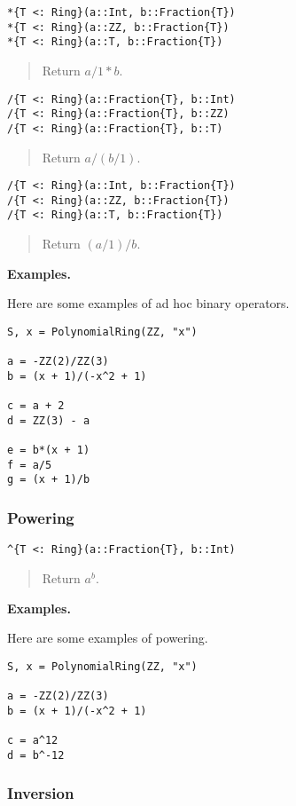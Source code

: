 \documentclass[a4paper,10pt]{article}
\newcommand{\desc}[1]{\vspace{-3mm}\begin{quote}#1\end{quote}}
\begin{document}
{{\begin{lstlisting}
*{T <: Ring}(a::Int, b::Fraction{T})
*{T <: Ring}(a::ZZ, b::Fraction{T})
*{T <: Ring}(a::T, b::Fraction{T})
\end{lstlisting}

\desc{Return $a/1 * b$.}

\begin{lstlisting}
/{T <: Ring}(a::Fraction{T}, b::Int)
/{T <: Ring}(a::Fraction{T}, b::ZZ)
/{T <: Ring}(a::Fraction{T}, b::T)
\end{lstlisting}

\desc{Return $a / (b/1)$.}

\begin{lstlisting}
/{T <: Ring}(a::Int, b::Fraction{T})
/{T <: Ring}(a::ZZ, b::Fraction{T})
/{T <: Ring}(a::T, b::Fraction{T})
\end{lstlisting}

\desc{Return $(a/1) / b$.}

\textbf{Examples.}

Here are some examples of ad hoc binary operators.

\begin{lstlisting}
S, x = PolynomialRing(ZZ, "x")

a = -ZZ(2)/ZZ(3)
b = (x + 1)/(-x^2 + 1)

c = a + 2
d = ZZ(3) - a

e = b*(x + 1)
f = a/5
g = (x + 1)/b
\end{lstlisting}

\subsubsection{Powering}

\begin{lstlisting}
^{T <: Ring}(a::Fraction{T}, b::Int)
\end{lstlisting}

\desc{Return $a^b$.}

\textbf{Examples.}

Here are some examples of powering.

\begin{lstlisting}
S, x = PolynomialRing(ZZ, "x")

a = -ZZ(2)/ZZ(3)
b = (x + 1)/(-x^2 + 1)

c = a^12
d = b^-12
\end{lstlisting}

\subsubsection{Inversion}

}}
\end{document}
